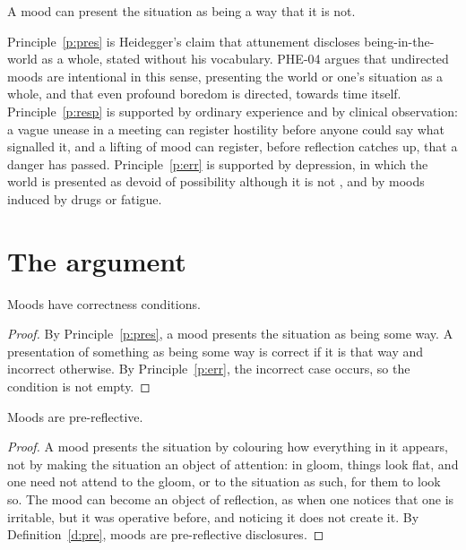 \documentclass{situationist-preprint}
\begin{document}
\begin{principle}[Error]\label{p:err}
A mood can present the situation as being a way that it is not.
\end{principle}

Principle~\ref{p:pres} is Heidegger's claim that attunement discloses being-in-the-world as a whole, stated without his vocabulary. PHE-04 argues that undirected moods are intentional in this sense, presenting the world or one's situation as a whole, and that even profound boredom is directed, towards time itself. Principle~\ref{p:resp} is supported by ordinary experience and by clinical observation: a vague unease in a meeting can register hostility before anyone could say what signalled it, and a lifting of mood can register, before reflection catches up, that a danger has passed. Principle~\ref{p:err} is supported by depression, in which the world is presented as devoid of possibility although it is not \citep{Ratcliffe2015}, and by moods induced by drugs or fatigue.

\section{The argument}

\begin{lemma}\label{l:corr}
Moods have correctness conditions.
\end{lemma}

\begin{proof}
By Principle~\ref{p:pres}, a mood presents the situation as being some way. A presentation of something as being some way is correct if it is that way and incorrect otherwise. By Principle~\ref{p:err}, the incorrect case occurs, so the condition is not empty.
\end{proof}

\begin{lemma}\label{l:pre}
Moods are pre-reflective.
\end{lemma}

\begin{proof}
A mood presents the situation by colouring how everything in it appears, not by making the situation an object of attention: in gloom, things look flat, and one need not attend to the gloom, or to the situation as such, for them to look so. The mood can become an object of reflection, as when one notices that one is irritable, but it was operative before, and noticing it does not create it. By Definition~\ref{d:pre}, moods are pre-reflective disclosures.
\end{proof}
\end{document}
